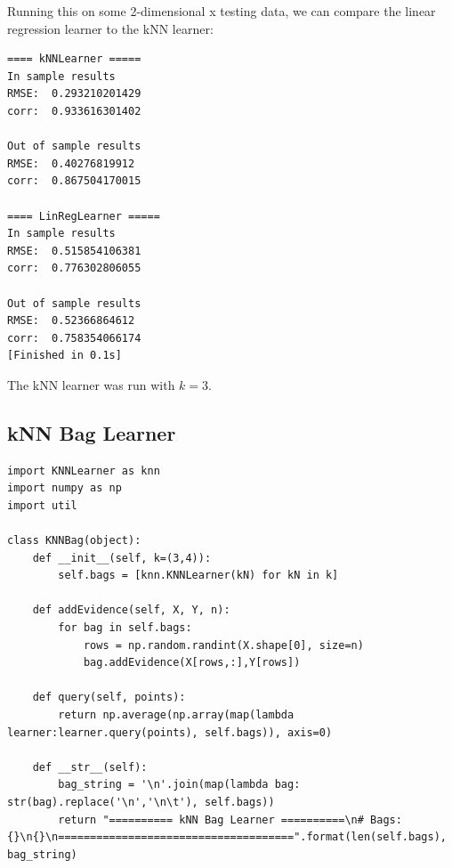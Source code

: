 \noindent Running this on some 2-dimensional x testing data, we can compare the linear regression learner to the kNN learner:

\noindent\begin{minipage}{\linewidth}
\begin{lstlisting}[style=python]
==== kNNLearner =====
In sample results
RMSE:  0.293210201429
corr:  0.933616301402

Out of sample results
RMSE:  0.40276819912
corr:  0.867504170015

==== LinRegLearner =====
In sample results
RMSE:  0.515854106381
corr:  0.776302806055

Out of sample results
RMSE:  0.52366864612
corr:  0.758354066174
[Finished in 0.1s]
\end{lstlisting}
\end{minipage}
\noindent The kNN learner was run with $k = 3$.

\subsection{kNN Bag Learner}
\noindent\begin{minipage}{\linewidth}
\begin{lstlisting}[style=python]
import KNNLearner as knn
import numpy as np
import util

class KNNBag(object):
	def __init__(self, k=(3,4)):
		self.bags = [knn.KNNLearner(kN) for kN in k]

	def addEvidence(self, X, Y, n):
		for bag in self.bags:
			rows = np.random.randint(X.shape[0], size=n)
			bag.addEvidence(X[rows,:],Y[rows])

	def query(self, points):
		return np.average(np.array(map(lambda learner:learner.query(points), self.bags)), axis=0)

	def __str__(self):
		bag_string = '\n'.join(map(lambda bag: str(bag).replace('\n','\n\t'), self.bags))
		return "========== kNN Bag Learner ==========\n# Bags: {}\n{}\n=====================================".format(len(self.bags), bag_string)
\end{lstlisting}
\end{minipage}